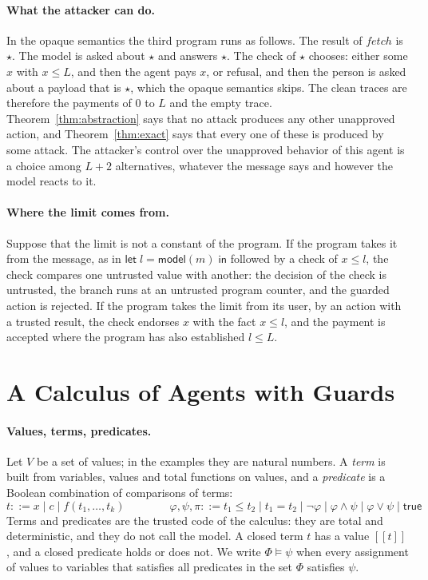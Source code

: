 \documentclass[acmsmall,nonacm,screen]{acmart}
\newcommand{\kw}[1]{\mathsf{#1}}
\newcommand{\nm}[1]{\mathit{#1}}
\newcommand{\model}[1]{\kw{model}(#1)}
\newcommand{\letin}[2]{\kw{let}\;#1 = #2\;\kw{in}}
\newcommand{\sem}[1]{[\![#1]\!]}
\newcommand{\op}{\star}
\begin{document}
\paragraph{What the attacker can do.} In the opaque semantics the third program runs as
follows. The result of $\nm{fetch}$ is $\op$. The model is asked about $\op$ and answers
$\op$. The check of $\op$ chooses: either some $x$ with $x \le L$, and then the agent pays
$x$, or refusal, and then the person is asked about a payload that is $\op$, which the opaque
semantics skips. The clean traces are therefore the payments of $0$ to $L$ and the empty
trace. Theorem~\ref{thm:abstraction} says that no attack produces any other unapproved
action, and Theorem~\ref{thm:exact} says that every one of these is produced by some attack.
The attacker's control over the unapproved behavior of this agent is a choice among $L + 2$
alternatives, whatever the message says and however the model reacts to it.

\paragraph{Where the limit comes from.} Suppose that the limit is not a constant of the
program. If the program takes it from the message, as in $\letin{l}{\model{m}}$ followed by a
check of $x \le l$, the check compares one untrusted value with another: the decision of the
check is untrusted, the branch runs at an untrusted program counter, and the guarded action
is rejected. If the program takes the limit from its user, by an action with a trusted result,
the check endorses $x$ with the fact $x \le l$, and the payment is accepted where the program
has also established $l \le L$.

\section{A Calculus of Agents with Guards}
\label{sec:calculus}

\paragraph{Values, terms, predicates.} Let $V$ be a set of values; in the examples they are
natural numbers. A \emph{term} is built from variables, values and total functions on values,
and a \emph{predicate} is a Boolean combination of comparisons of terms:
\[
t ::= x \mid c \mid f(t_1, \ldots, t_k) \qquad\qquad
\varphi, \psi, \pi ::= t_1 \le t_2 \mid t_1 = t_2 \mid \neg\varphi \mid \varphi \wedge \psi
  \mid \varphi \vee \psi \mid \kw{true}
\]
Terms and predicates are the trusted code of the calculus: they are total and deterministic,
and they do not call the model. A closed term $t$ has a value $\sem{t}$, and a closed
predicate holds or does not. We write $\Phi \models \psi$ when every assignment of values to
variables that satisfies all predicates in the set $\Phi$ satisfies $\psi$.
\end{document}
